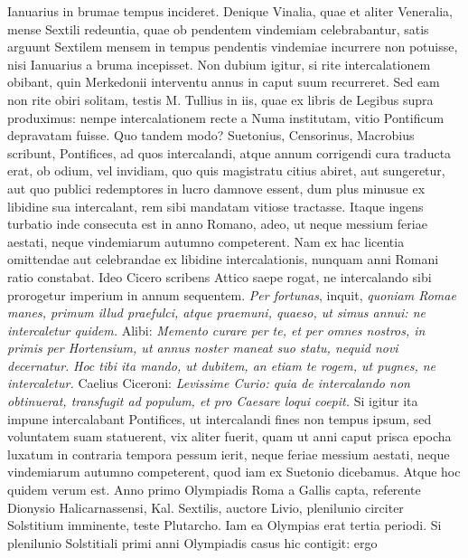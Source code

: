 Ianuarius in brumae tempus incideret.
Denique Vinalia, quae et aliter
Veneralia, mense Sextili redeuntia, quae ob pendentem vindemiam
celebrabantur, satis arguunt Sextilem mensem in tempus pendentis
vindemiae incurrere non potuisse, nisi Ianuarius a bruma incepisset.
Non dubium igitur, si rite intercalationem obibant, quin
Merkedonii interventu annus in caput suum recurreret.
Sed eam non
rite obiri solitam, testis M. Tullius in iis, quae ex libris de Legibus
supra produximus: nempe intercalationem recte a Numa institutam,
vitio Pontificum depravatam fuisse.
Quo tandem modo?
Suetonius,
Censorinus, Macrobius scribunt, Pontifices, ad quos intercalandi,
atque annum corrigendi cura traducta erat, ob odium,
vel invidiam, quo quis magistratu citius abiret, aut sungeretur,
aut quo publici redemptores in lucro damnove essent, dum plus minusue
ex libidine sua intercalant, rem sibi mandatam vitiose tractasse.
%
Itaque ingens turbatio inde consecuta est in anno Romano,
adeo, ut neque messium feriae aestati, neque vindemiarum autumno competerent.
Nam ex hac licentia omittendae aut celebrandae ex libidine
intercalationis, nunquam anni Romani ratio constabat.
Ideo Cicero
scribens Attico saepe rogat, ne intercalando sibi prorogetur imperium
in annum sequentem.
\textit{Per fortunas}, inquit, \textit{quoniam Romae
manes, primum illud praefulci, atque praemuni, quaeso, ut simus annui:
ne intercaletur quidem.}
Alibi: \textit{Memento curare per te, et per omnes
nostros, in primis per Hortensium, ut annus noster maneat suo statu,
nequid novi decernatur.}
\textit{Hoc tibi ita mando, ut dubitem, an etiam te
rogem, ut pugnes, ne intercaletur.}
Caelius Ciceroni: \textit{Levissime Curio:
quia de intercalando non obtinuerat, transfugit ad populum, et pro Caesare
loqui coepit.}
Si igitur ita impune intercalabant Pontifices, ut intercalandi
fines non tempus ipsum, sed voluntatem suam statuerent,
vix aliter fuerit, quam ut anni caput prisca epocha luxatum in contraria
tempora pessum ierit, neque feriae messium aestati, neque vindemiarum
autumno competerent, quod iam ex Suetonio dicebamus.
Atque hoc quidem verum est.
Anno primo Olympiadis
 Roma a Gallis capta, referente Dionysio Halicarnassensi,
 Kal. Sextilis, auctore Livio, plenilunio circiter
 Solstitium imminente,
teste Plutarcho.
Iam ea Olympias erat tertia periodi.
Si plenilunio
Solstitiali primi anni Olympiadis casus hic contigit: ergo
